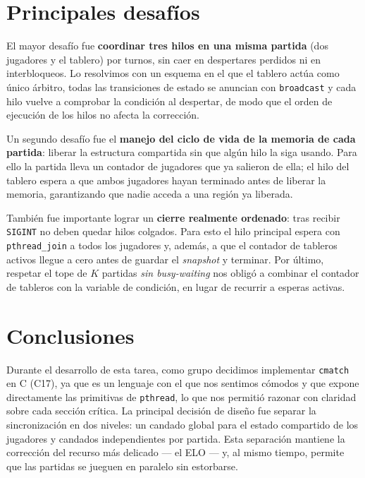 \documentclass[11pt]{article}
\begin{document}
\section{Principales desafíos}

El mayor desafío fue \textbf{coordinar tres hilos en una misma partida} (dos
jugadores y el tablero) por turnos, sin caer en despertares perdidos ni en
interbloqueos. Lo resolvimos con un esquema en el que el tablero actúa como único
árbitro, todas las transiciones de estado se anuncian con \texttt{broadcast} y
cada hilo vuelve a comprobar la condición al despertar, de modo que el orden de
ejecución de los hilos no afecta la corrección.

Un segundo desafío fue el \textbf{manejo del ciclo de vida de la memoria de cada
partida}: liberar la estructura compartida sin que algún hilo la siga usando.
Para ello la partida lleva un contador de jugadores que ya salieron de ella; el
hilo del tablero espera a que ambos jugadores hayan terminado antes de liberar la
memoria, garantizando que nadie acceda a una región ya liberada.

También fue importante lograr un \textbf{cierre realmente ordenado}: tras recibir
\texttt{SIGINT} no deben quedar hilos colgados. Para esto el hilo principal espera
con \texttt{pthread\_join} a todos los jugadores y, además, a que el contador de
tableros activos llegue a cero antes de guardar el \emph{snapshot} y terminar.
Por último, respetar el tope de $K$ partidas \emph{sin busy-waiting} nos obligó a
combinar el contador de tableros con la variable de condición, en lugar de
recurrir a esperas activas.

\section{Conclusiones}

Durante el desarrollo de esta tarea, como grupo decidimos implementar
\texttt{cmatch} en C (C17), ya que es un lenguaje con el que nos sentimos cómodos
y que expone directamente las primitivas de \texttt{pthread}, lo que nos permitió
razonar con claridad sobre cada sección crítica. La principal decisión de diseño
fue separar la sincronización en dos niveles: un candado global para el estado
compartido de los jugadores y candados independientes por partida. Esta
separación mantiene la corrección del recurso más delicado --- el ELO --- y, al
mismo tiempo, permite que las partidas se jueguen en paralelo sin estorbarse.
\end{document}
